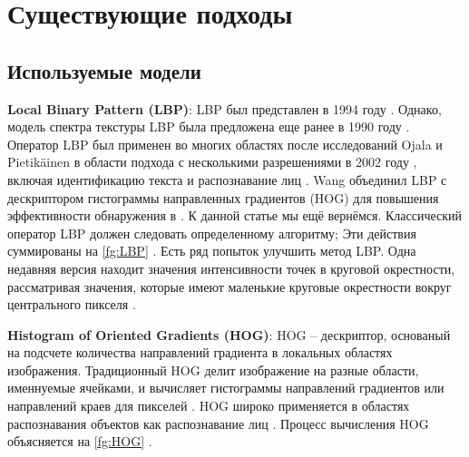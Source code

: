 \documentclass[12pt,twoside]{article}
\begin{document}
\section{Существующие подходы}
\subsection{Используемые модели}
\textbf{Local Binary Pattern (LBP)}: LBP был представлен в 1994 году \cite{Ojala1}. Однако, модель спектра текстуры LBP была предложена еще ранее в 1990 году \cite{9He}. Оператор LBP был применен во многих областях после исследований Ojala и Pietikäinen в области подхода с несколькими разрешениями в 2002 году \cite{Ojala2}, включая идентификацию текста \cite{Jung} и распознавание лиц \cite{Caicedo5}. Wang объединил LBP с дескриптором гистограммы направленных градиентов (HOG) для повышения эффективности обнаружения в \cite{Wang2}. К данной статье мы ещё вернёмся. Классический оператор LBP должен следовать определенному алгоритму; Эти действия суммированы на \ref{fg:LBP} \cite{7Kumar}. Есть ряд попыток улучшить метод LBP. Одна недавняя версия находит значения интенсивности точек в круговой окрестности, рассматривая значения, которые имеют маленькие круговые окрестности вокруг центрального пикселя \cite{LBPnew}.

\textbf{Histogram of Oriented Gradients (HOG)}: HOG -- дескриптор, основаный на подсчете количества направлений градиента в локальных областях изображения. Традиционный HOG делит изображение на разные области, именнуемые ячейками, и вычисляет гистограммы направлений градиентов или направлений краев для пикселей \cite{LBPnew}. HOG широко применяется в областях распознавания объектов как распознавание лиц \cite{Dniz}. Процесс вычисления HOG объясняется на \ref{fg:HOG} \cite{Dalal}.
\end{document}
